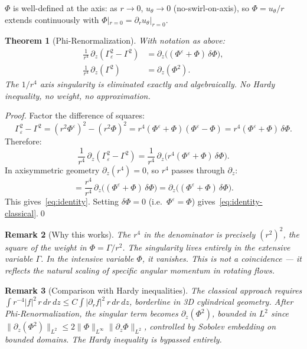 \documentclass[11pt]{article}
\newtheorem{theorem}{Theorem}[section]
\newtheorem{remark}[theorem]{Remark}
\newcommand{\eps}{\varepsilon}
\begin{document}
$\Phi$ is well-defined at the axis: as $r\to 0$,
$u_\theta\to 0$ (no-swirl-on-axis), so $\Phi=u_\theta/r$
extends continuously with $\Phi|_{r=0}=\partial_ru_\theta|_{r=0}$.

\begin{theorem}[Phi-Renormalization]\label{thm:phirenorm}
With notation as above:
\begin{align}
  \frac{1}{r^4}\,\partial_z(\Gamma_\eps^2-\Gamma^2)
  &= \partial_z\!\bigl((\Phi^\eps+\Phi)\,\delta\Phi\bigr),
  \label{eq:identity}\\
  \frac{1}{r^4}\,\partial_z(\Gamma^2)
  &= \partial_z(\Phi^2).
  \label{eq:identity-classical}
\end{align}
The $1/r^4$ axis singularity is eliminated exactly and algebraically.
No Hardy inequality, no weight, no approximation.
\end{theorem}

\begin{proof}
Factor the difference of squares:
\[
  \Gamma_\eps^2 - \Gamma^2
  = (r^2\Phi^\eps)^2 - (r^2\Phi)^2
  = r^4(\Phi^\eps+\Phi)(\Phi^\eps-\Phi)
  = r^4(\Phi^\eps+\Phi)\,\delta\Phi.
\]
Therefore:
\[
  \frac{1}{r^4}\,\partial_z(\Gamma_\eps^2-\Gamma^2)
  = \frac{1}{r^4}\,\partial_z\!\bigl(r^4(\Phi^\eps+\Phi)\,\delta\Phi\bigr).
\]
In axisymmetric geometry $\partial_z(r^4)=0$, so $r^4$ passes through $\partial_z$:
\[
  = \frac{r^4}{r^4}\,\partial_z\!\bigl((\Phi^\eps+\Phi)\,\delta\Phi\bigr)
  = \partial_z\!\bigl((\Phi^\eps+\Phi)\,\delta\Phi\bigr).
\]
This gives~\eqref{eq:identity}.
Setting $\delta\Phi=0$ (i.e.\ $\Phi^\eps=\Phi$) gives~\eqref{eq:identity-classical}.\qed
\end{proof}

\begin{remark}[Why this works]
The $r^4$ in the denominator is precisely $(r^2)^2$, the square of the
weight in $\Phi=\Gamma/r^2$. The singularity lives entirely in the
\emph{extensive} variable $\Gamma$. In the \emph{intensive} variable $\Phi$,
it vanishes. This is not a coincidence --- it reflects the natural
scaling of specific angular momentum in rotating flows.
\end{remark}

\begin{remark}[Comparison with Hardy inequalities]
The classical approach requires
$\int r^{-4}|f|^2\,r\,dr\,dz \leq C\int|\partial_r f|^2\,r\,dr\,dz$,
borderline in 3D cylindrical geometry.
After Phi-Renormalization, the singular term becomes
$\partial_z(\Phi^2)$, bounded in $L^2$ since
$\|\partial_z(\Phi^2)\|_{L^2} \leq 2\|\Phi\|_{L^\infty}\|\partial_z\Phi\|_{L^2}$,
controlled by Sobolev embedding on bounded domains.
The Hardy inequality is bypassed entirely.
\end{remark}
\end{document}
